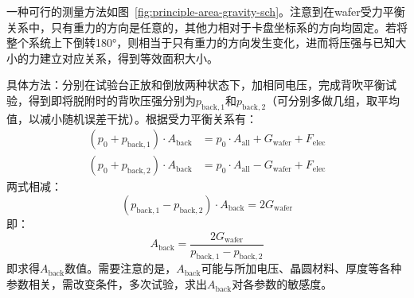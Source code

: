 一种可行的测量方法如图~\ref{fig:principle-area-gravity-sch}。注意到在wafer受力平衡关系中，只有重力的方向是任意的，其他力相对于卡盘坐标系的方向均固定。若将整个系统上下倒转\ang{180}，则相当于只有重力的方向发生变化，进而将压强与已知大小的力建立对应关系，得到等效面积大小。

具体方法：分别在试验台正放和倒放两种状态下，加相同电压，完成背吹平衡试验，得到即将脱附时的背吹压强分别为$p_{\mathrm{back},1}$和$p_{\mathrm{back},2}$（可分别多做几组，取平均值，以减小随机误差干扰）。根据受力平衡关系有：
\begin{equation}
\label{eq:principle-area-gravity-orig}
\begin{aligned}
(p_{0} + p_{\mathrm{back},1}) \cdot A_{\mathrm{back}} & = p_0 \cdot A_{\mathrm{all}} + G_{\mathrm{wafer}} + F_{\mathrm{elec}} \\
(p_{0} + p_{\mathrm{back},2}) \cdot A_{\mathrm{back}} & = p_0 \cdot A_{\mathrm{all}} - G_{\mathrm{wafer}} + F_{\mathrm{elec}}
\end{aligned}
\end{equation}
两式相减：
\[
(p_{\mathrm{back},1} - p_{\mathrm{back},2}) \cdot A_{\mathrm{back}} = 2 G_{\mathrm{wafer}}
\]
即：
\begin{equation}
\label{eq:principle-area-gravity-derived}
A_{\mathrm{back}} = \frac{2 G_{\mathrm{wafer}}}{p_{\mathrm{back},1} - p_{\mathrm{back},2}}
\end{equation}
即求得$A_{\mathrm{back}}$数值。需要注意的是，$A_{\mathrm{back}}$可能与所加电压、晶圆材料、厚度等各种参数相关，需改变条件，多次试验，求出$A_{\mathrm{back}}$对各参数的敏感度。





